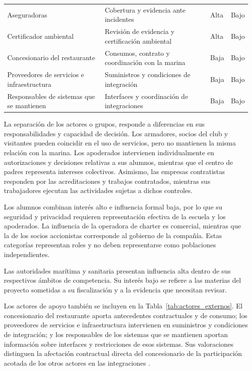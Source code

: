 \begin{longtable}{@{}L{.34\textwidth}L{.34\textwidth}L{.16\textwidth}L{\dimexpr.16\textwidth-18pt\relax}@{}}
Aseguradoras & Cobertura y evidencia ante incidentes & Alta & Bajo \\ \addlinespace \hline
Certificador ambiental & Revisión de evidencia y certificación ambiental & Alta & Bajo \\ \addlinespace \hline
Concesionario del restaurante & Consumos, contrato y coordinación con la marina & Baja & Bajo \\ \addlinespace \hline
Proveedores de servicios e infraestructura & Suministros y condiciones de integración & Baja & Bajo \\ \addlinespace \hline
Responsables de sistemas que se mantienen & Interfaces y coordinación de integraciones & Baja & Bajo \\
\end{longtable}
\endgroup

La separación de los actores o grupos, responde a diferencias en sus responsabilidades y capacidad de decisión. Los armadores, socios del club y visitantes pueden coincidir en el uso de servicios, pero no mantienen la misma relación con la marina. Los apoderados intervienen individualmente en autorizaciones y decisiones relativas a sus alumnos, mientras que el centro de padres representa intereses colectivos. Asimismo, las empresas contratistas responden por las acreditaciones y trabajos contratados, mientras sus trabajadores ejecutan las actividades sujetas a dichos controles.

Los alumnos combinan interés alto e influencia formal baja, por lo que su seguridad y privacidad requieren representación efectiva de la escuela y los apoderados. La influencia de la operadora de charter es comercial, mientras que la de los socios accionistas corresponde al gobierno de la compañía. Estas categorías representan roles y no deben representarse como poblaciones independientes.

Las autoridades marítima y sanitaria presentan influencia alta dentro de sus respectivos ámbitos de competencia. Su interés bajo se refiere a las materias del proyecto sometidas a su fiscalización y a la evidencia que necesitan revisar.

Los actores de apoyo también se incluyen en la Tabla~\ref{tab:actores_externos}. El concesionario del restaurante aporta antecedentes contractuales y de consumo; los proveedores de servicios e infraestructura intervienen en suministros y condiciones de integración; y los responsables de los sistemas que se mantienen aportan información sobre interfaces y restricciones de esos sistemas. Sus valoraciones distinguen la afectación contractual directa del concesionario de la participación acotada de los otros actores en las integraciones \parencite[cap.~11, pp.~26-27; cap.~12, pp.~27-28; cap.~15, RT-12.12, p.~35]{pucv-caso07-2026}.

